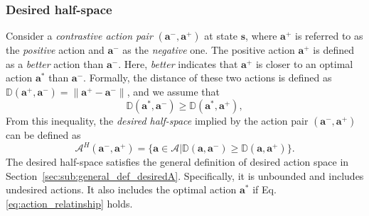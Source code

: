 \subsubsection{Desired half-space}
\label{sec:sub:desired_halfspace}


Consider a \textit{contrastive action pair} $(\bm  a^{-}, \bm a^{+})$ at state $\bm s$, 
where $\bm a^{+}$ is referred to as the \emph{positive} action and $\bm a^{-}$ as the \emph{negative} one. 
The positive action $\bm a^{+}$ is defined as a \emph{better} action than $\bm a^{-}$. 
Here, \emph{better} indicates that $\bm a^{+}$ is closer to an optimal action $\bm a^*$ than $\bm a^{-}$. 
Formally, the distance of these two actions is defined as $\mathbb{D}(\bm a^+, \bm a^-) = \|\bm a^+ - \bm a^- \|$, and 
we assume that
\begin{equation}
\mathbb{D}(\bm a^*, \bm a^-) \geq \mathbb{D}(\bm a^*, \bm a^+),   \label{eq:action_relatinship}
\end{equation}
From this inequality, the \emph{desired half-space} implied by the action pair $(\bm  a^{-}, \bm a^{+})$ can be defined as
\begin{equation}
    \mathcal{A}^H{(\bm a^-, \bm a^+)} = \{ \bm a \in \mathcal{A} | \mathbb{D}(\bm a, \bm a^-) \geq \mathbb{D}(\bm a, \bm a^+) \}.
    \label{eq:desired_half_space}
\end{equation}
The desired half-space satisfies the general definition of desired action space in Section~\ref{sec:sub:general_def_desiredA}.
Specifically, it is unbounded and includes undesired actions. It also includes the optimal action $\bm a^*$ if Eq. \eqref{eq:action_relatinship} holds.

